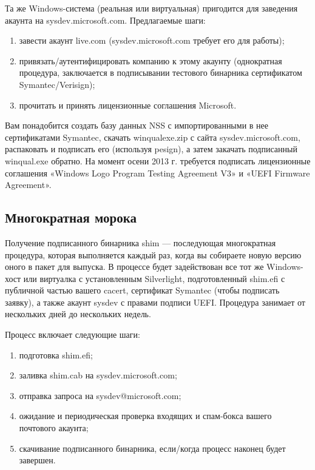 \documentclass[10pt, a5paper]{article}
\begin{document}
Та же Windows-система (реальная или виртуальная) пригодится для заведения акаунта на  sysdev.microsoft.com. Предлагаемые шаги:

\begin{enumerate}
  \item завести акаунт live.com (sysdev.microsoft.com требует его для работы);
  \item привязать/аутентифицировать компанию к этому акаунту (однократная процедура, заключается в подписывании тестового бинарника сертификатом Symantec/Verisign);
  \item прочитать и принять лицензионные соглашения Microsoft.
\end{enumerate}

Вам понадобится создать базу данных NSS с импортированными в нее сертификатами Symantec, скачать winqualexe.zip с сайта sysdev.microsoft.com, распаковать и подписать его (используя pesign), а затем закачать подписанный winqual.exe обратно. На момент осени 2013 г. требуется подписать лицензионные соглашения «Windows Logo Program Testing Agreement V3» и «UEFI Firmware Agreement».

\subsection*{Многократная морока}

Получение подписанного бинарника shim — последующая многократная процедура, которая выполняется каждый раз, когда вы собираете новую версию оного в пакет для выпуска. В процессе будет задействован все тот же Windows-хост или виртуалка с установленным Silverlight, подготовленный shim.efi с публичной частью вашего  cacert, сертификат Symantec (чтобы подписать заявку), а также акаунт sysdev с правами подписи UEFI.  Процедура занимает от нескольких дней до нескольких недель.

Процесс включает следующие шаги:

\begin{enumerate}
  \item подготовка shim.efi;
  \item заливка shim.cab на sysdev.microsoft.com;
  \item отправка запроса на sysdev@microsoft.com;
  \item ожидание и периодическая проверка входящих и спам-бокса вашего почтового акаунта;
  \item скачивание подписанного бинарника, если/когда процесс наконец будет завершен.
\end{enumerate}
\end{document}
